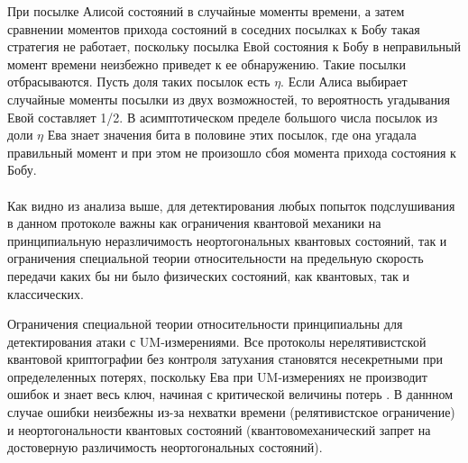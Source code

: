 При посылке Алисой состояний в случайные моменты времени, а затем сравнении моментов прихода состояний в соседних посылках к Бобу такая стратегия не работает, поскольку посылка Евой состояния к Бобу в неправильный момент времени неизбежно приведет к ее обнаружению.
Такие посылки отбрасываются. Пусть доля таких посылок есть $\eta$. Если Алиса выбирает случайные моменты посылки из двух возможностей, то вероятность угадывания Евой составляет 1/2. В асимптотическом пределе большого числа посылок из доли $\eta$ Ева знает значения бита в половине этих посылок, где она угадала правильный момент и при этом не произошло сбоя момента прихода состояния к Бобу.

\paragraph*{}
Как видно из анализа выше, для детектирования любых попыток подслушивания в данном протоколе важны как ограничения квантовой механики на принципиальную неразличимость неортогональных квантовых состояний, так и ограничения специальной теории относительности на предельную скорость передачи каких бы ни было физических состояний, как квантовых, так и классических.

Ограничения специальной теории относительности принципиальны для детектирования атаки с UM-измерениями. Все протоколы нерелятивистской квантовой криптографии без контроля затухания становятся несекретными при определеленных потерях, поскольку Ева при UM-измерениях не производит ошибок и знает весь ключ, начиная с критической величины потерь \cite{scarani2009secpraquakeydis}. В даннном случае ошибки неизбежны из-за нехватки времени (релятивистское ограничение) и неортогональности квантовых состояний (квантовомеханический запрет на достоверную различимость неортогональных состояний).
